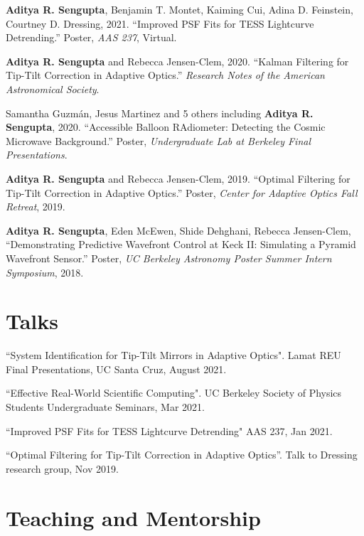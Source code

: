 \documentclass[paper=a4,fontsize=12pt]{scrartcl}
\newcommand{\NewPart}[1]{\section*{{#1}}}
\begin{document}
\begin{etaremune}
    \setlength{\itemsep}{0pt}
    \item \textbf{Aditya R. Sengupta}, Benjamin T. Montet, Kaiming Cui, Adina D. Feinstein, Courtney D. Dressing, 2021. ``Improved PSF Fits for TESS Lightcurve Detrending.'' Poster, \textit{AAS 237}, Virtual.
    \item \textbf{Aditya R. Sengupta} and Rebecca Jensen-Clem, 2020. ``Kalman Filtering for Tip-Tilt Correction in Adaptive Optics.'' \textit{Research Notes of the American Astronomical Society}.
    \item Samantha Guzm\'{a}n, Jesus Martinez and 5 others including \textbf{Aditya R. Sengupta}, 2020. ``Accessible Balloon RAdiometer: Detecting the Cosmic Microwave Background.'' Poster, \textit{Undergraduate Lab at Berkeley Final Presentations}.
    \item \textbf{Aditya R. Sengupta} and Rebecca Jensen-Clem, 2019. ``Optimal Filtering for Tip-Tilt Correction in Adaptive Optics.'' Poster, \textit{Center for Adaptive Optics Fall Retreat}, 2019.
    \item \textbf{Aditya R. Sengupta}, Eden McEwen, Shide Dehghani, Rebecca Jensen-Clem, ``Demonstrating Predictive Wavefront Control at Keck II: Simulating a Pyramid Wavefront Sensor.'' Poster, \textit{UC Berkeley Astronomy Poster Summer Intern Symposium}, 2018.
\end{etaremune}

\NewPart{Talks}

\begin{etaremune}
    \item ``System Identification for Tip-Tilt Mirrors in Adaptive Optics". Lamat REU Final Presentations, UC Santa Cruz, August 2021.
    \item ``Effective Real-World Scientific Computing". UC Berkeley Society of Physics Students Undergraduate Seminars, Mar 2021.
    \item ``Improved PSF Fits for TESS Lightcurve Detrending" AAS 237, Jan 2021.
    \item ``Optimal Filtering for Tip-Tilt Correction in Adaptive Optics''. Talk to Dressing research group, Nov 2019.
\end{etaremune}

\NewPart{Teaching and Mentorship}
\end{document}
